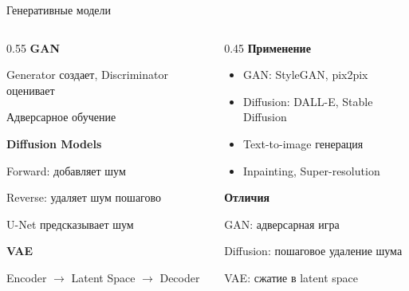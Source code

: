 \documentclass[aspectratio=169, 9pt]{beamer}
\begin{document}
\begin{frame}{Генеративные модели}
\begin{columns}[T]
\begin{column}{0.55\textwidth}
{\bfseries\textcolor{blue!70}{GAN}}

{\small Generator создает, Discriminator оценивает}

{\small Адверсарное обучение}

\vspace{0.3em}
{\bfseries\textcolor{green!50!black}{Diffusion Models}}

{\small Forward: добавляет шум}

{\small Reverse: удаляет шум пошагово}

{\small U-Net предсказывает шум}

\vspace{0.3em}
{\bfseries\textcolor{blue!70}{VAE}}

{\small Encoder $\to$ Latent Space $\to$ Decoder}
\end{column}

\begin{column}{0.45\textwidth}
{\bfseries\textcolor{blue!70}{Применение}}

{\small
\begin{itemize}
    \item GAN: StyleGAN, pix2pix
    \item Diffusion: DALL-E, Stable Diffusion
    \item Text-to-image генерация
    \item Inpainting, Super-resolution
\end{itemize}
}

\vspace{0.3em}
{\bfseries\textcolor{green!50!black}{Отличия}}

{\small GAN: адверсарная игра}

{\small Diffusion: пошаговое удаление шума}

{\small VAE: сжатие в latent space}
\end{column}
\end{columns}
\end{frame}
\end{document}
